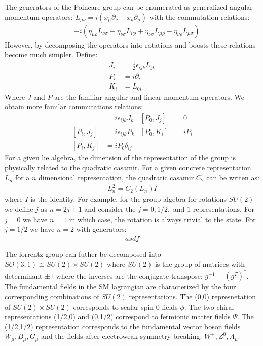 The generators of the Poincare group can be enumerated as generalized angular momentum operators:
$L_{\mu\nu} = i(x_\mu \partial_\nu - x_\nu \partial_\mu)$ with the commutation relations:
\begin{align*}
[L_{\mu\nu}, L_{\rho\sigma}] = -i(\eta_{\mu\rho} L_{\nu \sigma}  - \eta_{\nu \sigma} L_{\nu \rho} + 
\eta_{\nu \sigma} L_{\mu \rho} - \eta_{\nu \rho} L_{\mu \sigma})
\end{align*}
However, by decomposing the operators into rotations and boosts these relations become much simpler. Define:
\begin{align*}
J_i &= \frac{1}{2}\epsilon_{ijk} L_{jk}\\
P_i &= i\partial_i\\
K_i &= L_{0i}
\end{align*}
Where $J$ and $P$ are the familiar angular and linear momentum operators. 
We obtain more familar commutations relations:
\begin{align*}
[J_i, J_j] &= i \epsilon_{ijk}J_k  & [P_0,J_j] &= 0 \\
[P_i,J_j] &= i \epsilon_{ijk} P_k & [P_0, K_i] &= i P_i \\
[P_i,K_j] &= i P_0 \delta_{ij} & 
\end{align*}
For a given lie algebra, the dimension of the representation of the group is physically related to the 
 quadratic casamir. For a given concrete representation $L_n$ for a $n$ dimensional
representation, the quadratic casamir $C_2$ can be writen as:
\begin{align*}
L_n^2 = C_2(L_n)I
\end{align*}
where $I$ is the identity. For example, for the group algebra for rotations $SU(2)$ we define $j$ as $n=2j+1$
and consider the $j=0,1/2,$ and $1$ representations. For $j=0$ we have $n=1$ 
 in which case, the rotation is always
trivial to the state. For $j=1/2$ we have $n=2$ with generators:
\begin{align*}
asdf
\end{align*}

The lorrentz group can futher be decomposed into  $SO(3,1) \cong SU(2) \times SU(2)$
where $SU(2)$ is the group of matrices with determinant $\pm 1$ where the inverses are
 the conjugate transpose: $g^{-1} = (g^{T})^*$. The fundamental fields in the SM
lagrangian are characterized by the four corresponding combinations of $SU(2)$ representations. The (0,0) represnetation 
of $SU(2) \times SU(2)$ corresponds to scalar spin 0 fields $\phi$. The two chiral representations (1/2,0) and (0,1/2)
correspond to fermionic matter fields $\Psi$. The (1/2,1/2) representation corresponds to the fundamental 
vector boson fields $W_\mu, B_\mu, G_\mu$ and the fields after electroweak symmetry breaking. $W^{\pm}, Z^0, A_\mu$. 


